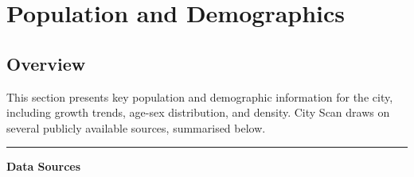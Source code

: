 \documentclass[
  letterpaper,
  DIV=11,
  numbers=noendperiod]{scrreprt}
\begin{document}
\chapter{Population and Demographics}\label{population-and-demographics}

\section{Overview}\label{overview}

This section presents key population and demographic information for the
city, including growth trends, age-sex distribution, and density. City
Scan draws on several publicly available sources, summarised below.

\begin{center}\rule{0.5\linewidth}{0.5pt}\end{center}

\textbf{Data Sources}
\end{document}
